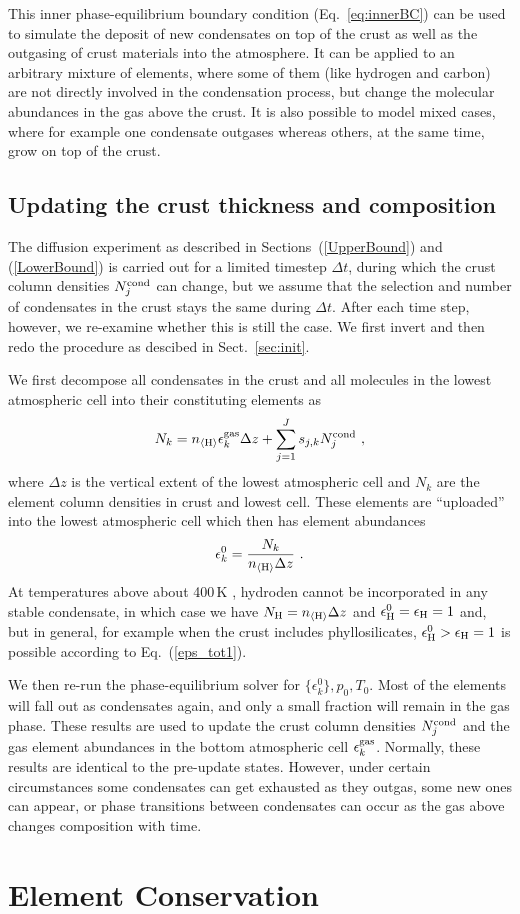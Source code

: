 \documentclass[11pt]{article}
\def\nH{n_{\langle\rm H\rangle}}
\def\ek{\epsilon_k}
\begin{document}
This inner phase-equilibrium boundary condition (Eq.~\ref{eq:innerBC})
can be used to simulate the deposit of new condensates on top of the
crust as well as the outgasing of crust materials into the
atmosphere. It can be applied to an arbitrary mixture of elements,
where some of them (like hydrogen and carbon) are not directly
involved in the condensation process, but change the molecular
abundances in the gas above the crust. It is also possible to model
mixed cases, where for example one condensate outgases whereas others,
at the same time, grow on top of the crust.


\subsection{Updating the crust thickness and composition}

The diffusion experiment as described in Sections~(\ref{UpperBound})
and (\ref{LowerBound}) is carried out for a limited timestep $\Delta
t$, during which the crust column densities $N_j^{\rm cond}$ can
change, but we assume that the selection and number of 
condensates in the crust stays the same during $\Delta t$.  After
each time step, however, we re-examine whether this is still the case.
We first invert and then redo the procedure as descibed in
Sect.~\ref{sec:init}.
 
We first decompose all condensates in the crust and all molecules in
the lowest atmospheric cell into their constituting elements as
\begin{equation}
  N_k = \nH\ek^{\rm gas}\Delta z + \sum_{j=1}^J s_{j,k}N_j^{\rm cond} \ ,
\end{equation}
where $\Delta z$ is the vertical extent of the lowest atmospheric cell and 
$N_k$ are the element column densities in crust and lowest cell. These
elements are ``uploaded'' into the lowest atmospheric cell which 
then has element abundances
\begin{equation}
  \ek^0 = \frac{N_k}{\nH\Delta z} \ .
  \label{eps_tot1}
\end{equation}
At temperatures above about 400\,K \citep{Woitke2017}, hydroden cannot
be incorporated in any stable condensate, in which case we have
$N_{\rm H} = \nH\Delta z$ and $\epsilon_{\rm H}^0 = \epsilon_{\rm H} =
1$ and, but in general, for example when the crust includes
phyllosilicates, $\epsilon_{\rm H}^0 > \epsilon_{\rm H} = 1$ is
possible according to Eq.~(\ref{eps_tot1}).

We then re-run the phase-equilibrium solver for $\{\ek^0\},p_0,T_0$.
Most of the elements will fall out as condensates again, and only 
a small fraction will remain in the gas phase. These results are used
to update the crust column densities $N_j^{\rm cond}$ and the gas 
element abundances in the bottom atmospheric cell $\ek^{\rm gas}$.
Normally, these results are identical to the pre-update states.
However, under certain circumstances some condensates can get
exhausted as they outgas, some new ones can appear, or phase
transitions between condensates can occur as the gas above changes
composition with time.

\section{Element Conservation}





\end{document}
